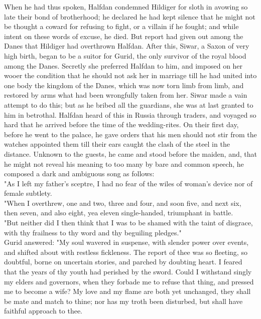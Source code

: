 \documentclass[10pt,a4paper]{report}
\begin{document}
When he had thus spoken, Halfdan condemned Hildiger for sloth in avowing so late their bond of brotherhood; he declared he had kept silence that he might not be thought a coward for refusing to fight, or a villain if he fought; and while intent on these words of excuse, he died. But report had given out among the Danes that Hildiger had overthrown Halfdan. After this, Siwar, a Saxon of very high birth, began to be a suitor for Gurid, the only survivor of the royal blood among the Danes. Secretly she preferred Halfdan to him, and imposed on her wooer the condition that he should not ask her in marriage till he had united into one body the kingdom of the Danes, which was now torn limb from limb, and restored by arms what had been wrongfully taken from her. Siwar made a vain attempt to do this; but as he bribed all the guardians, she was at last granted to him in betrothal. Halfdan heard of this in Russia through traders, and voyaged so hard that he arrived before the time of the wedding-rites. On their first day, before he went to the palace, he gave orders that his men should not stir from the watches appointed them till their ears caught the clash of the steel in the distance. Unknown to the guests, he came and stood before the maiden, and, that he might not reveal his meaning to too many by bare and common speech, he composed a dark and ambiguous song as follows:\\

"As I left my father's sceptre, I had no fear of the wiles of woman's device nor of female subtlety.\\

"When I overthrew, one and two, three and four, and soon five, and next six, then seven, and also eight, yea eleven single-handed, triumphant in battle.\\

"But neither did I then think that I was to be shamed with the taint of disgrace, with thy frailness to thy word and thy beguiling pledges."\\

Gurid answered: "My soul wavered in suspense, with slender power over events, and shifted about with restless fickleness. The report of thee was so fleeting, so doubtful, borne on uncertain stories, and parched by doubting heart. I feared that the years of thy youth had perished by the sword. Could I withstand singly my elders and governors, when they forbade me to refuse that thing, and pressed me to become a wife? My love and my flame are both yet unchanged, they shall be mate and match to thine; nor has my troth been disturbed, but shall have faithful approach to thee.\\
\end{document}
